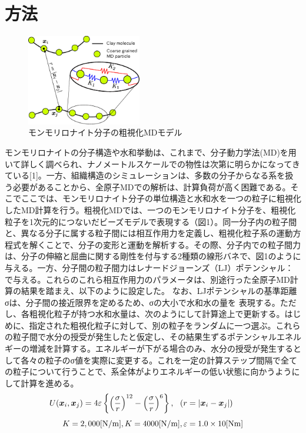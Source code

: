 ﻿\documentclass[11pt,a4j]{jarticle}
\begin{document}
\section{方法}
\begin{figure}
	\centering
	\includegraphics[keepaspectratio,width=50mm]{Figs/cg_model.eps}
	\caption{モンモリロナイト分子の粗視化MDモデル}
	\label{fig:fig1}
\end{figure}
モンモリロナイトの分子構造や水和挙動は、これまで、分子動力学法(MD)を用いて詳しく調べられ、ナノメートルスケールでの物性は次第に明らかになってきている[1]。一方、組織構造のシミュレーションは、多数の分子からなる系を扱う必要があることから、全原子MDでの解析は、計算負荷が高く困難である。そこでここでは、モンモリロナイト分子の単位構造と水和水を一つの粒子に粗視化したMD計算を行う。粗視化MDでは、一つのモンモリロナイト分子を、粗視化粒子を1次元的につないだビーズモデルで表現する（図1）。同一分子内の粒子間と、異なる分子に属する粒子間には相互作用力を定義し、粗視化粒子系の運動方程式を解くことで、分子の変形と運動を解析する。その際、分子内での粒子間力は、分子の伸縮と屈曲に関する剛性を付与する2種類の線形バネで、図1のように与える。一方、分子間の粒子間力はレナードジョーンズ（LJ）ポテンシャル：
で与える。これらのこれら相互作用力のパラメータは、別途行った全原子MD計算の結果を踏まえ、以下のように設定した。
なお、LJポテンシャルの基準距離σは、分子間の接近限界を定めるため、σの大小で水和水の量を
表現する。ただし、各粗視化粒子が持つ水和水量は、次のようにして計算途上で更新する。はじめに、指定された粗視化粒子に対して、別の粒子をランダムに一つ選ぶ。これらの粒子間で水分の授受が発生したと仮定し、その結果生ずるポテンシャルエネルギーの増減を計算する。エネルギーが下がる場合のみ、水分の授受が発生するとして各々の粒子のσ値を実際に変更する。これを一定の計算ステップ間隔で全ての粒子について行うことで、系全体がよりエネルギーの低い状態に向かうようにして計算を進める。
\begin{equation}
	U(\fat{x}_i,\fat{x}_j)=4\varepsilon
	\left\{ \left(\frac{\sigma}{r}\right)^{12}-
	\left( \frac{\sigma}{r}\right)^6\right\}, 
	\ \ \left(r=\left| \fat{x}_i-\fat{x}_j\right|\right)\hspace{10mm}
\end{equation}
\begin{equation}
	K  = 2,000[{\rm N / m}],   K  = 4000[{\rm N / m}],  \varepsilon = 1.0\times10     [{\rm Nm}]
\end{equation}
\end{document}
